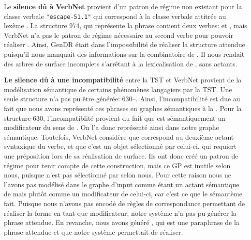 
Le \textbf{silence dû à VerbNet} provient d'un patron de régime non existant pour la classe verbale \texttt{"escape-51.1"} qui correspond à la classe verbale attitrée au lexème . La structure 974, qui représente la phrase  contient deux verbes:  et , mais VerbNet n'a pas le patron de régime nécessaire au second verbe pour pouvoir réaliser . Ainsi, GenDR était dans l'impossibilité de réaliser la structure attendue puisqu'il nous manquait des informations sur la combinatoire de . Il nous rendait des arbres de surface incomplets s'arrêtant à la lexicalisation de , sans actants.

\textbf{Le silence dû à une incompatibilité} entre la \ac{TST} et VerbNet provient de la modélisation sémantique de certains phénomènes langagiers par la \ac{TST}. Une seule structure n'a pas pu être générée: 630--. Ainsi, l'incompatibilité est due au fait que nous avons représenté ces phrases en graphes sémantiques à la \cite{mel2012semantics}. 
Pour la structure 630, l'incompatiblité provient du fait que  est sémantiquement un modificateur du sens de . On l'a donc représenté ainsi dans notre graphe sémantique. Toutefois, VerbNet considère que  correspond au deuxième actant syntaxique du verbe, et que c'est un objet sélectionné par celui-ci, qui requiert une préposition lors de sa réalisation de surface. Ils ont donc créé un patron de régime pour tenir compte de cette construction, mais ce \ac{GP} est inutile selon nous, puisque  n'est pas sélectionné par  selon nous. Pour cette raison nous ne l'avons pas modélisé dans le graphe d'input comme étant un actant sémantique de  mais plutôt comme un modificateur de celui-ci, car c'est ce que le sémantème  fait. Puisque nous n'avons pas encodé de règles de correspondance permettant de réaliser la forme  en tant que modificateur, notre système n'a pas pu générer la phrase attendue. En revanche, nous avons généré , qui est une paraphrase de la phrase attendue et que notre système permettait de réaliser. 

